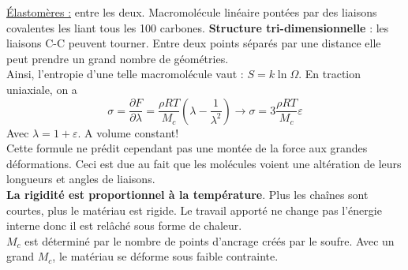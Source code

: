 \documentclass[../main.tex]{subfiles}
\begin{document}
\quad \underline{Élastomères :} entre les deux. Macromolécule linéaire pontées par des liaisons covalentes les liant tous les 100 carbones. \textbf{Structure tri-dimensionnelle} : les liaisons C-C peuvent tourner. Entre deux points séparés par une distance elle peut prendre un grand nombre de géométries.\\
Ainsi, l'entropie d'une telle macromolécule vaut : $S = k \ln{\Omega}$. En traction uniaxiale, on a \\
\begin{equation}
    \sigma = \frac{\partial F}{\partial \lambda} = \frac{\rho R T}{M_c} (\lambda - \frac{1}{\lambda^2}) \rightarrow \sigma = 3\frac{\rho R T}{M_c}\varepsilon
\end{equation}
Avec $\lambda = 1+\varepsilon$. \warning A volume constant!\\
Cette formule ne prédit cependant pas une montée de la force aux grandes déformations. Ceci est due au fait que les molécules voient une altération de leurs longueurs et angles de liaisons.\\
\textbf{La rigidité est proportionnel à la température}. Plus les chaînes sont courtes, plus le matériau est rigide. Le travail apporté ne change pas l'énergie interne donc il est relâché sous forme de chaleur.\\
$M_c$ est déterminé par le nombre de points d'ancrage créés par le soufre. Avec un grand $M_c$, le matériau se déforme sous faible contrainte.\\
\end{document}
